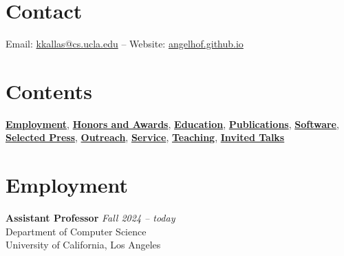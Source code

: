 \documentclass[margin]{res}
\begin{document}
\begin{resume}

\section{Contact} 
Email: \href{mailto:kkallas@cs.ucla.edu}{kkallas@cs.ucla.edu} -- Website: \href{https://angelhof.github.io/}{angelhof.github.io}


\section{Contents}

\hyperlink{sec:employment}{\textbf{Employment}},
\hyperlink{sec:honors}{\textbf{Honors and Awards}},
\hyperlink{sec:education}{\textbf{Education}},
\hyperlink{sec:publications}{\textbf{Publications}},
\hyperlink{sec:software}{\textbf{Software}},
\hyperlink{sec:press}{\textbf{Selected Press}},
\hyperlink{sec:outreach}{\textbf{Outreach}},
\hyperlink{sec:service}{\textbf{Service}},
\hyperlink{sec:teaching}{\textbf{Teaching}},
\hyperlink{sec:talks}{\textbf{Invited Talks}}

\section{Employment}
\hypertarget{sec:employment}{}

\textbf{Assistant Professor} \hfill {\em Fall 2024 -- today} \\
Department of Computer Science \\
University of California, Los Angeles


\end{resume}
\end{document}
